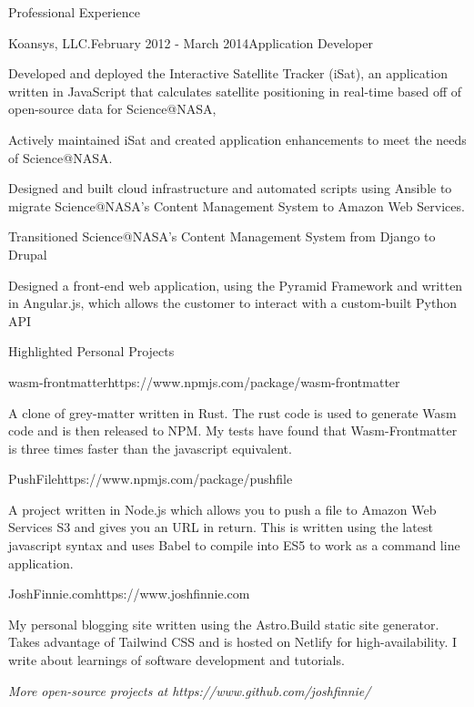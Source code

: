 \documentclass{bluefin_cv}
\begin{document}
\begin{bfcvSection}{Professional Experience}
\begin{bfcvWorkSubsection}{Koansys, LLC.}{February 2012 - March 2014}{Application Developer}
\item Developed and deployed the Interactive Satellite Tracker (iSat), an application written in JavaScript that calculates satellite positioning in real-time based off of open-source data for Science@NASA,
\item Actively maintained iSat and created application enhancements to meet the needs of Science@NASA.
\item Designed and built cloud infrastructure and automated scripts using Ansible to migrate Science@NASA’s Content Management System to Amazon Web Services.
\item Transitioned Science@NASA’s Content Management System from Django to Drupal
\item Designed a front-end web application, using the Pyramid Framework and written in Angular.js, which allows the customer to interact with a custom-built Python API
\end{bfcvWorkSubsection}
\end{bfcvSection}

\begin{bfcvSection}{Highlighted Personal Projects}

\begin{bfcvProjSubsection}{wasm-frontmatter}{https://www.npmjs.com/package/wasm-frontmatter}
\item A clone of grey-matter written in Rust. The rust code is used to generate Wasm code and is then released to NPM. My tests have found that Wasm-Frontmatter is three times faster than the javascript equivalent.
\end{bfcvProjSubsection}

\begin{bfcvProjSubsection}{PushFile}{https://www.npmjs.com/package/pushfile}
\item A project written in Node.js which allows you to push a file to Amazon Web Services S3 and gives you an URL in return. This is written using the latest javascript syntax and uses Babel to compile into ES5 to work as a command line application.
\end{bfcvProjSubsection}

\begin{bfcvProjSubsection}{JoshFinnie.com}{https://www.joshfinnie.com}
\item My personal blogging site written using the Astro.Build static site generator. Takes advantage of Tailwind CSS and is hosted on Netlify for high-availability. I write about learnings of software development and tutorials.
\end{bfcvProjSubsection}

\smallskip
\centerline{\textsl{More open-source projects at https://www.github.com/joshfinnie/}}

\end{bfcvSection}
\end{document}
